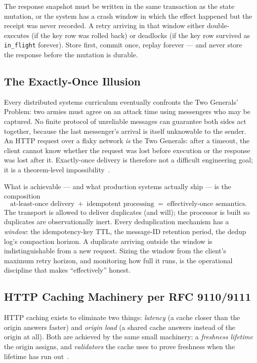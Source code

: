 \begin{warningbox}
The response snapshot must be written in the same transaction as the state
mutation, or the system has a crash window in which the effect happened but
the receipt was never recorded. A retry arriving in that window either
double-executes (if the key row was rolled back) or deadlocks (if the key
row survived as \texttt{in\_flight} forever). Store first, commit once,
replay forever --- and never store the response before the mutation is
durable.
\end{warningbox}

\subsection{The Exactly-Once Illusion}
\label{sec:ch10-exactly-once}

Every distributed systems curriculum eventually confronts the Two Generals'
Problem: two armies must agree on an attack time using messengers who may be
captured. No finite protocol of unreliable messages can guarantee both sides
act together, because the last messenger's arrival is itself unknowable to
the sender. An HTTP request over a flaky network \emph{is} the Two Generals:
after a timeout, the client cannot know whether the request was lost before
execution or the response was lost after it. Exactly-once delivery is
therefore not a difficult engineering goal; it is a theorem-level
impossibility~\cite{kleppmann2017ddia}.

What is achievable --- and what production systems actually ship --- is the
composition
\[
  \text{at-least-once delivery} \;+\; \text{idempotent processing}
  \;=\; \text{effectively-once semantics}.
\]
The transport is allowed to deliver duplicates (and will); the processor is
built so duplicates are observationally inert. Every deduplication mechanism
has a \emph{window}: the idempotency-key TTL, the message-ID retention
period, the dedup log's compaction horizon. A duplicate arriving outside the
window is indistinguishable from a new request. Sizing the window from the
client's maximum retry horizon, and monitoring how full it runs, is the
operational discipline that makes ``effectively'' honest.

\subsection{HTTP Caching Machinery per RFC 9110/9111}
\label{sec:ch10-caching}

HTTP caching exists to eliminate two things: \emph{latency} (a cache closer
than the origin answers faster) and \emph{origin load} (a shared cache
answers instead of the origin at all). Both are achieved by the same small
machinery: a \emph{freshness lifetime} the origin assigns, and
\emph{validators} the cache uses to prove freshness when the lifetime has
run out~\cite{rfc9110}.

